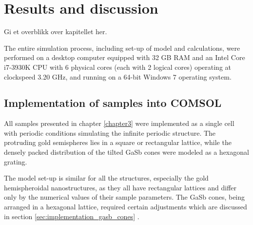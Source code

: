 
\chapter{Results and discussion}
Gi et overblikk over kapitellet her.

The entire simulation process, including set-up of model and calculations, were performed on a desktop computer equipped with 32 GB RAM and an Intel Core i7-3930K CPU with 6 physical cores (each with 2 logical cores) operating at clockspeed 3.20 GHz, and running on a 64-bit Windows 7 operating system.
\section{Implementation of samples into COMSOL}
All samples presented in chapter \ref{chapter3} were implemented as a single cell with periodic conditions simulating the infinite periodic structure. The protruding gold semispheres lies in a square or rectangular lattice, while the densely packed distribution of the tilted GaSb cones were modeled as a hexagonal grating.

The model set-up is similar for all the structures, especially the gold hemispheroidal nanostructures, as they all have rectangular lattices and differ only by the numerical values of their sample parameters. The GaSb cones, being arranged in a hexagonal lattice, required certain adjustments which are discussed in section \ref{sec:implementation_gasb_cones} . 

